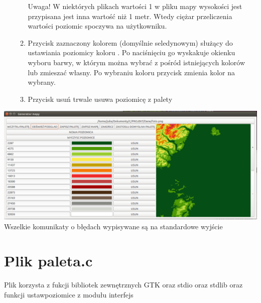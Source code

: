 \documentclass[a4paper]{article}
\begin{document}
\begin{enumerate}
\begin{enumerate}
 	Uwaga! W niektórych plikach wartości 1 w pliku mapy wysokości jest przypisana jest inna wartość niż 1 metr. Wtedy ciężar przeliczenia wartości poziomic spoczywa na użytkowniku.
 	\item{}
 	Przycisk zaznaczony kolorem (domyślnie seledynowym) służący do ustawiania poziomicy koloru . Po naciśnięciu go wyskakuje okienku wyboru barwy, w którym można wybrać z pośród istniejących kolorów lub zmieszać własny. Po wybraniu koloru przycisk zmienia kolor na wybrany.
 	\item{}
 	Przycisk usuń trwale usuwa poziomicę z palety
 	\end{enumerate}
  \end{enumerate}
 
  \includegraphics[scale=0.4]{zmapa}\\
  Wszelkie komunikaty o błędach wypisywane są na standardowe wyjście
 \section{Plik paleta.c}
 Plik korzysta z fukcji bibliotek zewnętrznych GTK oraz stdio oraz stdlib oraz funkcji ustaw\textunderscore poziomice z modułu interfejs
 
\end{document}
